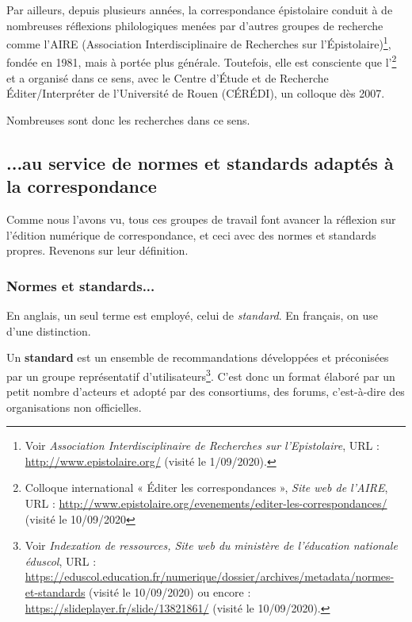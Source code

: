 Par ailleurs, depuis plusieurs années, la correspondance épistolaire conduit à de nombreuses réflexions philologiques menées par d'autres groupes de recherche comme l'AIRE (Association Interdisciplinaire de Recherches sur l'Épistolaire)\footnote{Voir \emph{Association Interdisciplinaire de Recherches sur l'Epistolaire}, URL : \url{http://www.epistolaire.org/} (visité le 1/09/2020).}, fondée en 1981, mais à portée plus générale. Toutefois, elle est consciente que l'\footnote{Colloque international « Éditer les correspondances », \emph{Site web de l'AIRE}, URL : \url{http://www.epistolaire.org/evenements/editer-les-correspondances/} (visité le 10/09/2020} et a organisé dans ce sens, avec le Centre d’Étude et de Recherche Éditer/Interpréter de l’Université de Rouen (CÉRÉDI), un colloque dès 2007.

Nombreuses sont donc les recherches dans ce sens.

\subsection{...au service de normes et standards adaptés à la correspondance}

Comme nous l'avons vu, tous ces groupes de travail font avancer la réflexion sur l'édition numérique de correspondance, et ceci avec des normes et standards propres. Revenons sur leur définition.

\subsubsection{Normes et standards...}

En anglais, un seul terme est employé, celui de \emph{standard}. En français, on use d'une distinction. 

Un \textbf{standard} est un ensemble de recommandations développées et préconisées par un groupe représentatif d’utilisateurs\footnote{Voir \emph{Indexation de ressources, Site web du ministère de l'éducation nationale éduscol}, URL : \url{https://eduscol.education.fr/numerique/dossier/archives/metadata/normes-et-standards} (visité le 10/09/2020) ou encore : \url{https://slideplayer.fr/slide/13821861/} (visité le 10/09/2020).}. C'est donc un format élaboré par un petit nombre d’acteurs et adopté par des consortiums, des forums, c'est-à-dire des organisations non officielles.

